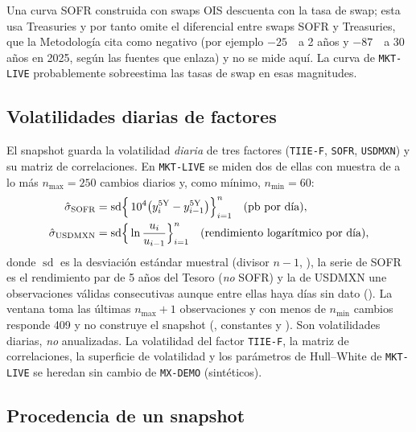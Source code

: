 \begin{sloppypar}
\begin{diferencia}
  Una curva SOFR construida con swaps OIS descuenta con la tasa de swap; esta usa Treasuries y por tanto omite
  el diferencial entre swaps SOFR y Treasuries, que la Metodología cita como negativo (por ejemplo $-25$~\pb\ a
  2 años y $-87$~\pb\ a 30 años en 2025, según las fuentes que enlaza) y no se mide aquí. La curva de
  \texttt{MKT-LIVE} probablemente sobreestima las tasas de swap en esas magnitudes.
\end{diferencia}

\subsection{Volatilidades diarias de factores}\label{sec:cap13-vols}

El snapshot guarda la volatilidad \emph{diaria} de tres factores (\texttt{TIIE-F}, \texttt{SOFR},
\texttt{USDMXN}) y su matriz de correlaciones. En \texttt{MKT-LIVE} se miden dos de ellas con muestra de a lo
más $n_{\max}=250$ cambios diarios y, como mínimo, $n_{\min}=60$:
\begin{align}
  \hat\sigma_{\text{SOFR}} &= \operatorname{sd}\Bigl\{\,10^{4}\bigl(y^{5\mathrm{Y}}_{i}-y^{5\mathrm{Y}}_{i-1}\bigr)\Bigr\}_{i=1}^{n}
    \quad\text{(pb por día)}, \label{eq:cap13-vol-sofr}\\
  \hat\sigma_{\text{USDMXN}} &= \operatorname{sd}\Bigl\{\,\ln\frac{u_i}{u_{i-1}}\Bigr\}_{i=1}^{n}
    \quad\text{(rendimiento logarítmico por día)}, \label{eq:cap13-vol-fx}
\end{align}
donde $\operatorname{sd}$ es la desviación estándar muestral (divisor $n-1$,
), la serie de SOFR es el rendimiento par de 5 años del Tesoro
(\emph{no} SOFR) y la de USDMXN une observaciones válidas consecutivas aunque entre ellas haya días sin dato
(). La ventana toma las últimas $n_{\max}+1$ observaciones y
con menos de $n_{\min}$ cambios responde 409 y no construye el snapshot
(, constantes  y
). Son volatilidades diarias, \emph{no} anualizadas. La
volatilidad del factor \texttt{TIIE-F}, la matriz de correlaciones, la superficie de volatilidad y los
parámetros de Hull--White de \texttt{MKT-LIVE} se heredan sin cambio de \texttt{MX-DEMO} (sintéticos).

\subsection{Procedencia de un snapshot}\label{sec:cap13-procedencia}


\end{sloppypar}
